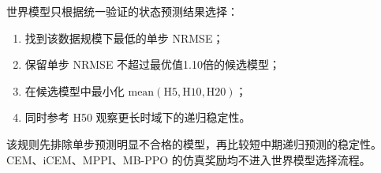 世界模型只根据统一验证的状态预测结果选择：
\begin{enumerate}
  \item 找到该数据规模下最低的单步 NRMSE；
  \item 保留单步 NRMSE 不超过最优值1.10倍的候选模型；
  \item 在候选模型中最小化 $\mathrm{mean}(\mathrm{H5},\mathrm{H10},\mathrm{H20})$；
  \item 同时参考 H50 观察更长时域下的递归稳定性。
\end{enumerate}
该规则先排除单步预测明显不合格的模型，再比较短中期递归预测的稳定性。CEM、iCEM、MPPI、MB-PPO 的仿真奖励均不进入世界模型选择流程。
